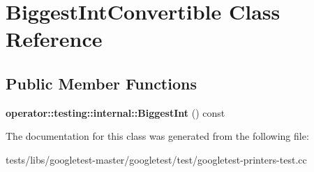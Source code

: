\hypertarget{classBiggestIntConvertible}{}\section{Biggest\+Int\+Convertible Class Reference}
\label{classBiggestIntConvertible}
\subsection*{Public Member Functions}
\begin{DoxyCompactItemize}
\item 
\mbox{\label{classBiggestIntConvertible_aa3dc4bbff87d412758b9adbefa19c6d0}} 
{\bfseries operator\+::testing\+::internal\+::\+Biggest\+Int} () const
\end{DoxyCompactItemize}


The documentation for this class was generated from the following file\+:\begin{DoxyCompactItemize}
\item 
tests/libs/googletest-\/master/googletest/test/googletest-\/printers-\/test.\+cc\end{DoxyCompactItemize}
